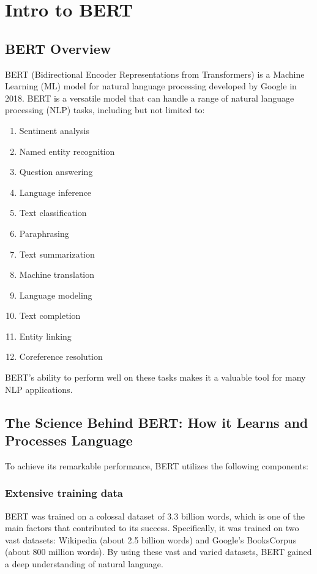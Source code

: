 \section{Intro to BERT}

\subsection{BERT Overview}

BERT (Bidirectional Encoder Representations from Transformers) is a Machine Learning (ML) model for natural language processing developed by Google in 2018. BERT is a versatile model that can handle a range of natural language processing (NLP) tasks, including but not limited to:

\begin{enumerate}
    \item Sentiment analysis
    \item Named entity recognition
    \item Question answering
    \item Language inference
    \item Text classification
    \item Paraphrasing
    \item Text summarization
    \item Machine translation
    \item Language modeling
    \item Text completion
    \item Entity linking
    \item Coreference resolution
\end{enumerate}
BERT's ability to perform well on these tasks makes it a valuable tool for many NLP applications.

\subsection{The Science Behind BERT: How it Learns and Processes Language}

To achieve its remarkable performance, BERT utilizes the following components:

\subsubsection{Extensive training data}
BERT was trained on a colossal dataset of 3.3 billion words, which is one of the main factors that contributed to its success. Specifically, it was trained on two vast datasets: Wikipedia (about 2.5 billion words) and Google's BooksCorpus (about 800 million words). By using these vast and varied datasets, BERT gained a deep understanding of natural language.

